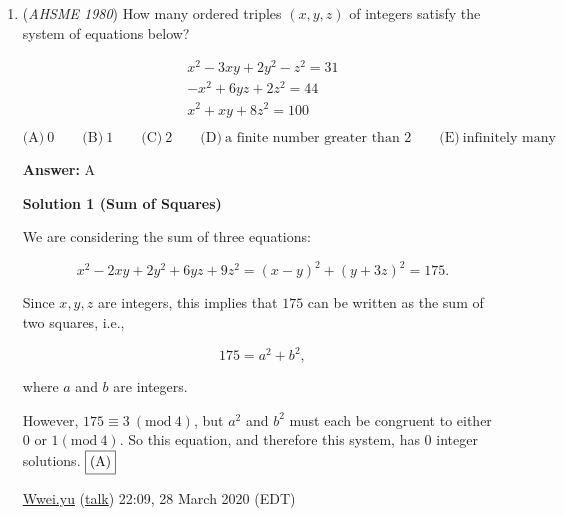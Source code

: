 \begin{enumerate}
\textbf{Solution 3}

We start by noting that 
 \[x + 1 \equiv -x^2 \mod (x^2+x+1).\]Let $n = 3k+r$, where $r \in \{ 0,1,2 \}$.

 Thus we have 
 \[x^{4n} + x^{2n} + 1 \equiv x^{4r} + x^{2r} + 1 \mod (x^3 -1).\]

 When $r = 0$, 
 \[x^{4n} + x^{2n} + 1 \equiv 3 \mod (x^3 -1).\]When $r = 1$, 
 \[x^{4n} + x^{2n} + 1 \equiv x^2 + x + 1 \mod (x^3 -1),\] which will be divisible by $x^2+x+1$.

 When $r = 2$, 
 \[x^{4n} + x^{2n} + 1 \equiv x^2 + x + 1 \mod (x^3 -1),\] which will also be divisible by $x^2+x+1$.

 Thus $r \ne 0$, so $n$ cannot be divisible by $3$, and the answer is $\textrm{(C)}$.

 


	\item (\textit{AHSME 1980}) How many ordered triples $(x,y,z)$ of integers satisfy the system of equations below? 


 
 \[\begin{array}{l} x^2-3xy+2y^2-z^2=31 \\ -x^2+6yz+2z^2=44 \\ x^2+xy+8z^2=100\\ \end{array}\]
$\text{(A)} \ 0 \qquad  \text{(B)} \ 1 \qquad  \text{(C)} \ 2 \qquad  \text{(D)}\ \text{a finite number greater than 2}\qquad \text{(E)}\ \text{infinitely many}$

 \textbf{Answer: }A



\textbf{Solution 1 (Sum of Squares)}

We are considering the sum of three equations:

 
 \[x^2 - 2xy + 2y^2 + 6yz + 9z^2 = (x - y)^2 + (y + 3z)^2 = 175.\]

 Since $x, y, z$ are integers, this implies that $175$ can be written as the sum of two squares, i.e.,

 
 \[175 = a^2 + b^2,\]

 where $a$ and $b$ are integers. 

 However, $175 \equiv 3\ (\mathrm{mod}\ 4)$, but $a^2$ and $b^2$ must each be congruent to either $0$ or $1 (\mathrm{mod}\ 4)$. So this equation, and therefore this system, has $0$ integer solutions. $\fbox{(A)}$

 \href{https://artofproblemsolving.com/wiki/index.php?title=User:Wwei.yu&action=edit&redlink=1}{Wwei.yu} (\href{https://artofproblemsolving.com/wiki/index.php?title=User\_talk:Wwei.yu&action=edit&redlink=1}{talk}) 22:09, 28 March 2020 (EDT)


\end{enumerate}
